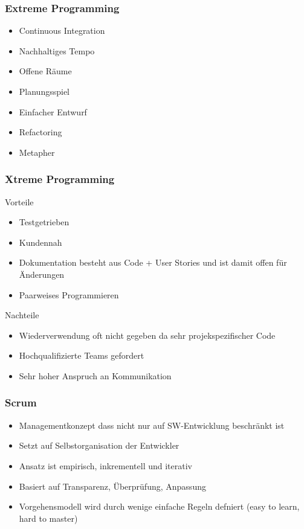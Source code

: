 \begin{frame}
\frametitle{Extreme Programming}
	\begin{itemize}
		\item Continuous Integration
		\item Nachhaltiges Tempo
		\item Offene Räume
		\item Planungsspiel
		\item Einfacher Entwurf
		\item Refactoring
		\item Metapher
	\end{itemize}
\end{frame}

\begin{frame}
\frametitle{Xtreme Programming}
	Vorteile
	\begin{itemize}
		\item Testgetrieben
		\item Kundennah
		\item Dokumentation besteht aus Code + User Stories und ist damit offen für Änderungen
		\item Paarweises Programmieren
	\end{itemize}
	\bigskip
	Nachteile
	\begin{itemize}
		\item Wiederverwendung oft nicht gegeben da sehr projekspezifischer Code
		\item Hochqualifizierte Teams gefordert
		\item Sehr hoher Anspruch an Kommunikation
	\end{itemize}
\end{frame}

\begin{frame}
\frametitle{Scrum}
	\begin{itemize}
		\item Managementkonzept dass nicht nur auf SW-Entwicklung beschränkt ist
		\item Setzt auf Selbstorganisation der Entwickler
		\item Ansatz ist empirisch, inkrementell und iterativ
		\item Basiert auf Transparenz, Überprüfung, Anpassung
		\item Vorgehensmodell wird durch wenige einfache Regeln defniert (easy to learn, hard to master)
	\end{itemize}
\end{frame}

